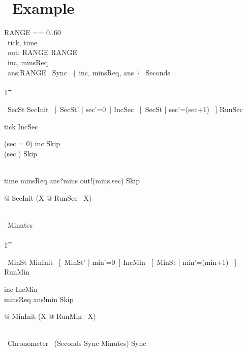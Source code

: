 \documentclass{article}
\begin{document}
	\section{\Circus\ Example}	
	\begin{circus}
		RANGE == 0..60 \\
		\circchannel\ tick, time \\ %
		\circchannel\ out: RANGE \cross RANGE \\%
		\circchannel\ inc, minsReq \\ %
		\circchannel\ ans:RANGE %
		\also
		\circchanset\ Sync \ \{ inc, minsReq, ans \}%
		\also
		\circprocess\ Seconds \ \\
		\circbegin\ \\ %
		\t1
		\begin{block}
			\circstate\ SecSt %
			\also
			SecInit \ [~SecSt' | sec'=0~] %
			\also
			IncSec \ [~\Delta SecSt | sec'=(sec+1) ~] %
			\also
			RunSec \  %
			\begin{block}
				tick \then IncSec \Semi\
				\begin{block}
					(sec = 0) \guard inc \then Skip \\ %
					\extchoice (sec ) \guard Skip
				\end{block}
				\\ %
				\extchoice time \then minsReq \then ans?mins \then out!(mins,sec) \then Skip
			\end{block}
			\also
			@ SecInit \Semi (\mu X @ RunSec \Semi\ X)
		\end{block}
		\\ %
		\circend
		\also
		\circprocess\ Minutes \defs\ \\
		\circbegin\ \\ %
		\t1
		\begin{block}
			\circstate\ MinSt %
			\also
			MinInit \defs\ [~MinSt' | min'=0~] %
			\also
			IncMin \defs\ [~\Delta MinSt | min'=(min+1) \mod 60~] %
			\also
			RunMin \defs\  %
			\begin{block}
				inc \then IncMin \\ %
				\extchoice minsReq \then ans!min \then Skip
			\end{block}
			\also
			@ MinInit \Semi (\mu X @ RunMin \Semi\ X)
		\end{block}
		\\ %
		\circend
		\also
		\circprocess\ Chronometer \ (Seconds \lpar Sync \rpar Minutes) \hide Sync \\ %
	\end{circus}%
\end{document}
